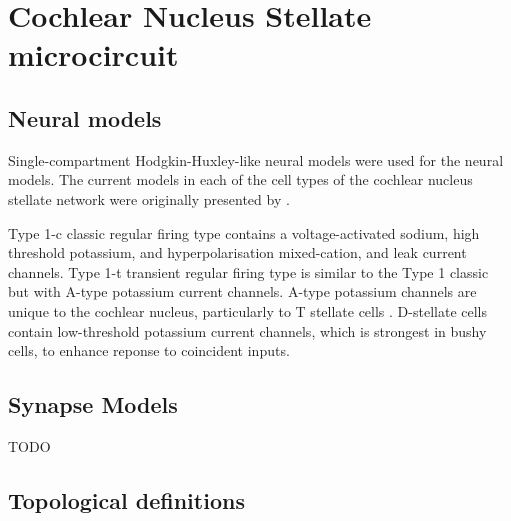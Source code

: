 




\section{Cochlear Nucleus Stellate microcircuit    \label{sec:CN:cochl-nucl-stell}}

\subsection{Neural models}

Single-compartment Hodgkin-Huxley-like neural models were used for the neural
models.  The current models in each of the cell types of the cochlear nucleus
stellate network were originally presented by \citet{RothmanManis:2003b}.


Type 1-c classic regular firing type contains a voltage-activated sodium, high
threshold potassium, and hyperpolarisation mixed-cation, and leak current
channels.  Type 1-t transient regular firing type is similar to the Type 1
classic but with A-type potassium current channels.  A-type potassium channels
are unique to the cochlear nucleus, particularly to T stellate cells
\citep{RothmanManis:2003,RothmanManis:2003a,RothmanManis:2003b}. D-stellate
cells contain low-threshold potassium current channels, which is strongest in
bushy cells, to enhance reponse to coincident inputs.




\subsection{Synapse Models}

TODO

\subsection{Topological definitions    \label{sec:CN:tonot-conn}}

